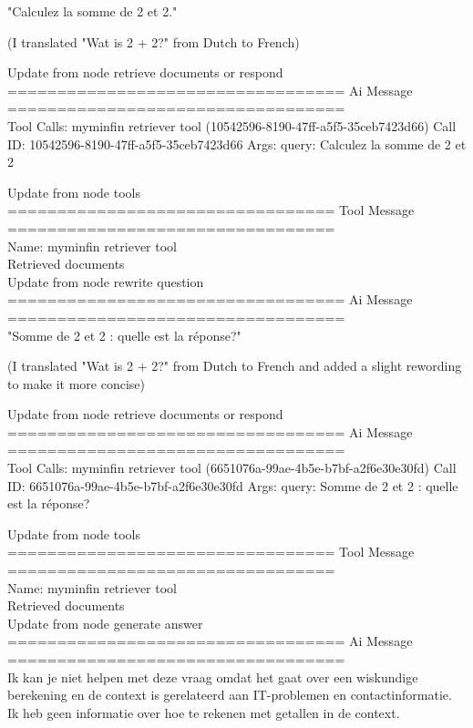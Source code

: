 "Calculez la somme de 2 et 2." 

(I translated "Wat is 2 + 2?" from Dutch to French)



Update from node retrieve documents or respond
\\[1em]
================================== Ai Message ==================================
\\[1em]
Tool Calls:
myminfin retriever tool (10542596-8190-47ff-a5f5-35ceb7423d66)
Call ID: 10542596-8190-47ff-a5f5-35ceb7423d66
Args:
query: Calculez la somme de 2 et 2



Update from node tools
\\[1em]
================================= Tool Message =================================
\\[1em]
Name: myminfin retriever tool
\\[1em]
Retrieved documents
\\[1em]

Update from node rewrite question
\\[1em]
================================== Ai Message ==================================
\\[1em]
"Somme de 2 et 2 : quelle est la réponse?" 

(I translated "Wat is 2 + 2?" from Dutch to French and added a slight rewording to make it more concise)



Update from node retrieve documents or respond
\\[1em]
================================== Ai Message ==================================
\\[1em]
Tool Calls:
myminfin retriever tool (6651076a-99ae-4b5e-b7bf-a2f6e30e30fd)
Call ID: 6651076a-99ae-4b5e-b7bf-a2f6e30e30fd
Args:
query: Somme de 2 et 2 : quelle est la réponse?

Update from node tools
\\[1em]
================================= Tool Message =================================
\\[1em]
Name: myminfin retriever tool
\\[1em]
Retrieved documents
\\[1em]

Update from node generate answer
\\[1em]
================================== Ai Message ==================================
\\[1em]
Ik kan je niet helpen met deze vraag omdat het gaat over een wiskundige berekening en de context is gerelateerd aan IT-problemen en contactinformatie. Ik heb geen informatie over hoe te rekenen met getallen in de context.


